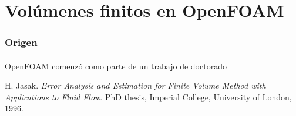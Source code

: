 \section{Vol\'umenes finitos en OpenFOAM\textsuperscript{\textregistered}}        


\begin{frame}
    \frametitle{Origen}
    
    OpenFOAM\textsuperscript{\textregistered} comenz\'o como parte de un trabajo de doctorado
    \vspace{0.5cm}
    \begin{block}{}
    H. Jasak. \emph{Error Analysis and Estimation for Finite Volume Method with Applications to Fluid Flow}. PhD thesis, Imperial College, University of London, 1996.
    \end{block}

\end{frame}



